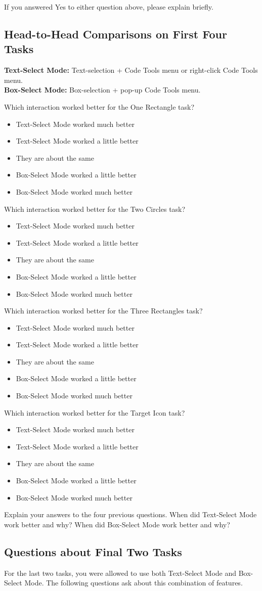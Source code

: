 If you answered Yes to either question above,
please explain briefly.

\clearpage

\subsection*{Head-to-Head Comparisons on First Four Tasks}

\newcommand{\interactionA}{Text-Select Mode}
\newcommand{\interactionB}{Box-Select Mode}

\newcommand{\interactionSummary}{
\textbf{\interactionA{}:}
Text-selection + Code Tools menu or right-click Code Tools menu.\\
\textbf{\interactionB{}:}
Box-selection + pop-up Code Tools menu.
}

\interactionSummary{}

\newcommand{\sidebysidetaskquestions}[1]{

Which interaction worked better for the #1 task?

\begin{itemize}
  \item \interactionA{} worked much better
  \item \interactionA{} worked a little better
  \item They are about the same
  \item \interactionB{} worked a little better
  \item \interactionB{} worked much better
\end{itemize}

}
\sidebysidetaskquestions{One Rectangle}

\sidebysidetaskquestions{Two Circles}


\sidebysidetaskquestions{Three Rectangles}

\sidebysidetaskquestions{Target Icon}


Explain your answers to the four previous questions.
When did \interactionA{} work better and why?
When did \interactionB{} work better and why?

\clearpage

\subsection*{Questions about Final Two Tasks}

For the last two tasks, you were allowed to use both
\interactionA{} and \interactionB{}. The following
questions ask about this combination of features.
\\

